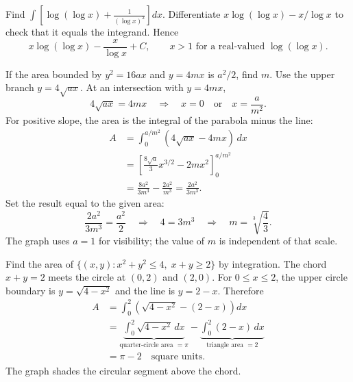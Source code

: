 \begin{enumerate}[label={},leftmargin=0pt,itemsep=9pt]
 Find $\displaystyle\int\left[\log(\log x)+\frac1{(\log x)^2}\right]dx$.
\solution Differentiate $x\log(\log x)-x/\log x$ to check that it equals the integrand. Hence
\[
\boxed{x\log(\log x)-\frac{x}{\log x}+C},\qquad x>1\text{ for a real-valued }\log(\log x).
\]

 If the area bounded by $y^2=16ax$ and $y=4mx$ is $a^2/2$, find $m$.
\solution Use the upper branch $y=4\sqrt{ax}$. At an intersection with $y=4mx$,
\[
4\sqrt{ax}=4mx\quad\Longrightarrow\quad x=0\quad\text{or}\quad x=\frac{a}{m^2}.
\]
For positive slope, the area is the integral of the parabola minus the line:
\begin{align*}
A&=\int_0^{a/m^2}\left(4\sqrt{ax}-4mx\right)\,dx\\
 &=\left[\frac{8\sqrt a}{3}x^{3/2}-2mx^2\right]_0^{a/m^2}\\
 &=\frac{8a^2}{3m^3}-\frac{2a^2}{m^3}=\frac{2a^2}{3m^3}.
\end{align*}
Set the result equal to the given area:
\[
\frac{2a^2}{3m^3}=\frac{a^2}{2}\quad\Longrightarrow\quad4=3m^3\quad\Longrightarrow\quad\boxed{m=\sqrt[3]{\frac43}}.
\]
The graph uses $a=1$ for visibility; the value of $m$ is independent of that scale.

 Find the area of $\{(x,y):x^2+y^2\le4,\;x+y\ge2\}$ by integration.
\solution The chord $x+y=2$ meets the circle at $(0,2)$ and $(2,0)$. For $0\le x\le2$, the upper circle boundary is $y=\sqrt{4-x^2}$ and the line is $y=2-x$. Therefore
\begin{align*}
A&=\int_0^2\left(\sqrt{4-x^2}-(2-x)\right)dx\\
 &=\underbrace{\int_0^2\sqrt{4-x^2}\,dx}_{\text{quarter-circle area }=\pi}
 -\underbrace{\int_0^2(2-x)\,dx}_{\text{triangle area }=2}\\
 &=\boxed{\pi-2}\quad\text{square units}.
\end{align*}
The graph shades the circular segment above the chord.
\end{enumerate}

